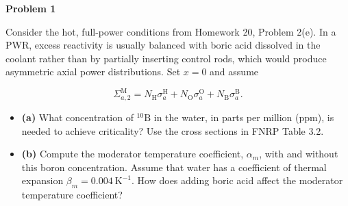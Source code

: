 \noindent\textbf{Problem 1}

Consider the hot, full-power conditions from Homework 20, Problem 2(e). In a PWR, excess reactivity is usually balanced with boric acid dissolved in the coolant rather than by partially inserting control rods, which would produce asymmetric axial power distributions. Set \(x=0\) and assume

\[
\Sigma^{\mathrm{M}}_{a,2}
=N_{\mathrm{H}}\sigma^{\mathrm{H}}_a
+N_{\mathrm{O}}\sigma^{\mathrm{O}}_a
+N_{\mathrm{B}}\sigma^{\mathrm{B}}_a.
\]

\begin{itemize}
\tightlist
\item
  \textbf{(a)} What concentration of \({}^{10}\mathrm{B}\) in the water, in parts per million (ppm), is needed to achieve criticality? Use the cross sections in FNRP Table 3.2.
\item
  \textbf{(b)} Compute the moderator temperature coefficient, \(\alpha_m\), with and without this boron concentration. Assume that water has a coefficient of thermal expansion \(\beta_m=0.004~\mathrm{K^{-1}}\). How does adding boric acid affect the moderator temperature coefficient?
\end{itemize}

